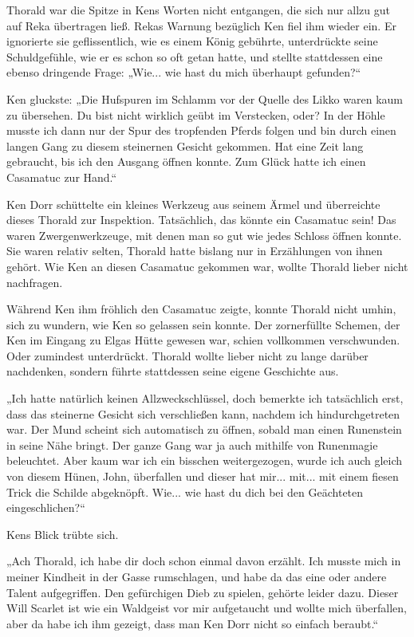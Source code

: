 Thorald war die Spitze in Kens Worten nicht entgangen, die sich nur allzu gut auf Reka übertragen ließ. Rekas Warnung bezüglich Ken fiel ihm wieder ein. Er ignorierte sie geflissentlich, wie es einem König gebührte, unterdrückte seine Schuldgefühle, wie er es schon so oft getan hatte, und stellte stattdessen eine ebenso dringende Frage: „Wie... wie hast du mich überhaupt gefunden?“

Ken gluckste: „Die Hufspuren im Schlamm vor der Quelle des Likko waren kaum zu übersehen. Du bist nicht wirklich geübt im Verstecken, oder? In der Höhle musste ich dann nur der Spur des tropfenden Pferds folgen und bin durch einen langen Gang zu diesem steinernen Gesicht gekommen. Hat eine Zeit lang gebraucht, bis ich den Ausgang öffnen konnte. Zum Glück hatte ich einen Casamatuc zur Hand.“

Ken Dorr schüttelte ein kleines Werkzeug aus seinem Ärmel und überreichte dieses Thorald zur Inspektion. Tatsächlich, das könnte ein Casamatuc sein! Das waren Zwergenwerkzeuge, mit denen man so gut wie jedes Schloss öffnen konnte. Sie waren relativ selten, Thorald hatte bislang nur in Erzählungen von ihnen gehört. Wie Ken an diesen Casamatuc gekommen war, wollte Thorald lieber nicht nachfragen.

Während Ken ihm fröhlich den Casamatuc zeigte, konnte Thorald nicht umhin, sich zu wundern, wie Ken so gelassen sein konnte. Der zornerfüllte Schemen, der Ken im Eingang zu Elgas Hütte gewesen war, schien vollkommen verschwunden. Oder zumindest unterdrückt. Thorald wollte lieber nicht zu lange darüber nachdenken, sondern führte stattdessen seine eigene Geschichte aus.

„Ich hatte natürlich keinen Allzweckschlüssel, doch bemerkte ich tatsächlich erst, dass das steinerne Gesicht sich verschließen kann, nachdem ich hindurchgetreten war. Der Mund scheint sich automatisch zu öffnen, sobald man einen Runenstein in seine Nähe bringt. Der ganze Gang war ja auch mithilfe von Runenmagie beleuchtet. Aber kaum war ich ein bisschen weitergezogen, wurde ich auch gleich von diesem Hünen, John, überfallen und dieser hat mir... mit... mit einem fiesen Trick die Schilde abgeknöpft. Wie... wie hast du dich bei den Geächteten eingeschlichen?“

Kens Blick trübte sich.

„Ach Thorald, ich habe dir doch schon einmal davon erzählt. Ich musste mich in meiner Kindheit in der Gasse rumschlagen, und habe da das eine oder andere Talent aufgegriffen. Den gefürchigen Dieb zu spielen, gehörte leider dazu. Dieser Will Scarlet ist wie ein Waldgeist vor mir aufgetaucht und wollte mich überfallen, aber da habe ich ihm gezeigt, dass man Ken Dorr nicht so einfach beraubt.“

